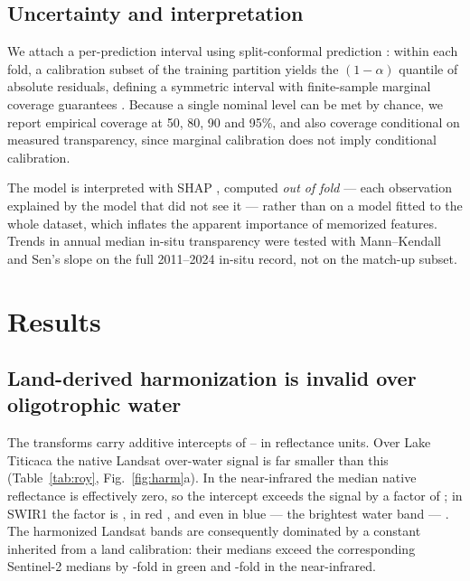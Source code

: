 \documentclass[final,5p,times,twocolumn,authoryear]{elsarticle}
\begin{document}
\subsection{Uncertainty and interpretation}

We attach a per-prediction interval using split-conformal prediction
\citep{Angelopoulos2023}: within each fold, a calibration subset of the
training partition yields the $(1-\alpha)$ quantile of absolute residuals,
defining a symmetric interval with finite-sample marginal coverage guarantees
\citep{Romano2019}. Because a single nominal level can be met by chance, we
report empirical coverage at 50, 80, 90 and 95\%, and also coverage
conditional on measured transparency, since marginal calibration does not
imply conditional calibration.

The model is interpreted with SHAP \citep{Lundberg2017,Lundberg2020},
computed \emph{out of fold} --- each observation explained by the model that
did not see it --- rather than on a model fitted to the whole dataset, which
inflates the apparent importance of memorized features. Trends in annual
median in-situ transparency were tested with Mann--Kendall and Sen's slope
\citep{Mann1945,Sen1968} on the full 2011--2024 in-situ record, not on the
match-up subset.

\section{Results}\label{sec:results}

\subsection{Land-derived harmonization is invalid over oligotrophic
water}\label{sec:harm}

The \citet{Roy2016} transforms carry additive intercepts of
\numRoyInterceptMin--\numRoyInterceptMax{} in reflectance units. Over Lake
Titicaca the native Landsat over-water signal is far smaller than this
(Table~\ref{tab:roy}, Fig.~\ref{fig:harm}a). In the near-infrared the median
native reflectance is effectively zero, so the intercept exceeds the signal
by a factor of \numRoyRatioNir; in SWIR1 the factor is \numRoyRatioSwirone,
in red \numRoyRatioRed, and even in blue --- the brightest water band ---
\numRoyRatioBlue. The harmonized Landsat bands are consequently dominated by
a constant inherited from a land calibration: their medians exceed the
corresponding Sentinel-2 medians by \numLsOverSTwoGreen-fold in green and
\numLsOverSTwoNir-fold in the near-infrared.
\end{document}
